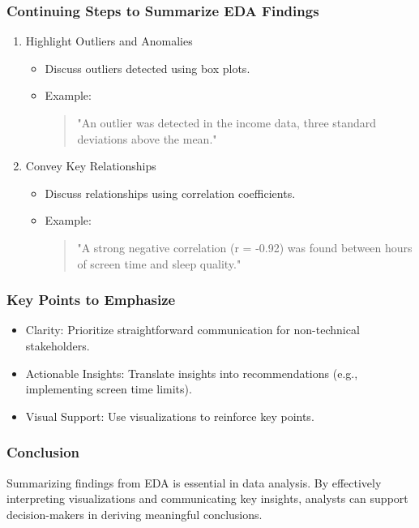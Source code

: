 \documentclass[aspectratio=169]{beamer}
\begin{document}
\begin{frame}[fragile]
    \frametitle{Continuing Steps to Summarize EDA Findings}
    \begin{enumerate}[resume]
        \item Highlight Outliers and Anomalies
        \begin{itemize}
            \item Discuss outliers detected using box plots.
            \item Example: 
            \begin{quote}
                "An outlier was detected in the income data, three standard deviations above the mean."
            \end{quote}
        \end{itemize}

        \item Convey Key Relationships
        \begin{itemize}
            \item Discuss relationships using correlation coefficients.
            \item Example: 
            \begin{quote}
                "A strong negative correlation (r = -0.92) was found between hours of screen time and sleep quality."
            \end{quote}
        \end{itemize}
    \end{enumerate}
\end{frame}

\begin{frame}[fragile]
    \frametitle{Key Points to Emphasize}
    \begin{itemize}
        \item Clarity: Prioritize straightforward communication for non-technical stakeholders.
        \item Actionable Insights: Translate insights into recommendations (e.g., implementing screen time limits).
        \item Visual Support: Use visualizations to reinforce key points.
    \end{itemize}
\end{frame}

\begin{frame}[fragile]
    \frametitle{Conclusion}
    Summarizing findings from EDA is essential in data analysis. By effectively interpreting visualizations and communicating key insights, analysts can support decision-makers in deriving meaningful conclusions.
\end{frame}
\end{document}
